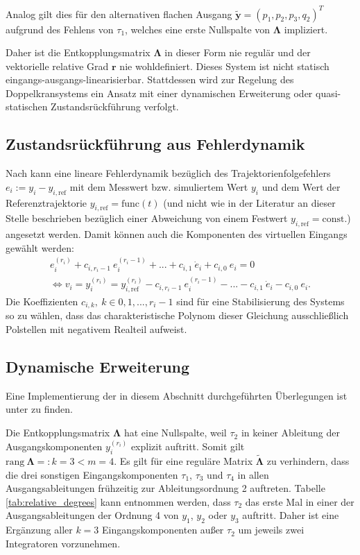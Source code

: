 Analog gilt dies für den alternativen flachen Ausgang $\tilde{\mathbf{y}} = (p_1, p_2, p_3, q_2)^T$ aufgrund des Fehlens von $\tau_1$, welches eine erste Nullspalte von $\boldsymbol{\Lambda}$ impliziert.

Daher ist die Entkopplungsmatrix $\boldsymbol{\Lambda}$ in dieser Form nie regulär und der vektorielle relative Grad $\mathbf{r}$ nie wohldefiniert. Dieses System ist nicht statisch eingangs-ausgangs-linearisierbar. Stattdessen wird zur Regelung des Doppelkransystems ein Ansatz mit einer dynamischen Erweiterung oder quasi-statischen Zustandsrückführung verfolgt. 

\subsection{Zustandsrückführung aus Fehlerdynamik}
\label{sec:error_dynamics}
Nach \cite[S. 195]{NLRT_Roebenack} kann eine lineare Fehlerdynamik bezüglich des Trajektorienfolgefehlers $e_i := y_i - y_{i, \text{ref}}$ mit dem Messwert bzw. simuliertem Wert $y_i$ und dem Wert der Referenztrajektorie $y_{i, \text{ref}} = \mathrm{func}(t)$ (und nicht wie in der Literatur an dieser Stelle beschrieben bezüglich einer Abweichung von einem Festwert $y_{i, \text{ref}} = \mathrm{const.}$) angesetzt werden. Damit können auch die Komponenten des virtuellen Eingangs gewählt werden:
\begin{align}
	e_i^{(r_i)} + c_{i, r_i-1} \ e_i^{(r_i-1)} + ... + c_{i, 1} \ \dot{e}_i + c_{i, 0} \ e_i = 0 
	\\
	\Leftrightarrow v_i = y_i^{(r_i)} = y_{i, \text{ref}}^{(r_i)} - c_{i, r_i-1} \ e_i^{(r_i-1)} - ... - c_{i, 1} \ \dot{e}_i - c_{i, 0} \ e_i.
\end{align}
Die Koeffizienten $c_{i, k}, \ k \in {0, 1, ..., r_i-1}$ sind für eine Stabilisierung des Systems so zu wählen, dass das charakteristische Polynom dieser Gleichung ausschließlich Polstellen mit negativem Realteil aufweist.

\subsection{Dynamische Erweiterung}
\label{sec_dynamic_extension_control}
Eine Implementierung der in diesem Abschnitt durchgeführten Überlegungen ist unter \cite[flatness\_notebooks/ODE\_flatness\_trajectory\_control\_simulation\_dyn.ipynb]{SAGithub} zu finden.

Die Entkopplungsmatrix $\boldsymbol{\Lambda}$ hat eine Nullspalte, weil $\tau_2$ in keiner Ableitung der Ausgangskomponenten $y_i^{(r_i)}$ explizit auftritt. Somit gilt $\text{rang} \ \boldsymbol{\Lambda} =: k = 3 < m = 4$. Es gilt für eine reguläre Matrix $\tilde{\boldsymbol{\Lambda}}$ zu verhindern, dass die drei sonstigen Eingangskomponenten $\tau_1$, $\tau_3$ und $\tau_4$ in allen Ausgangsableitungen frühzeitig zur Ableitungsordnung 2 auftreten. Tabelle \ref{tab:relative_degrees} kann entnommen werden, dass $\tau_{2}$ das erste Mal in einer der Ausgangsableitungen der Ordnung 4 von $y_1$, $y_2$ oder $y_3$ auftritt. Daher ist eine Ergänzung aller $k = 3$ Eingangskomponenten außer $\tau_2$ um jeweils zwei Integratoren vorzunehmen. \cite[S. 200]{NLRT_Roebenack}

